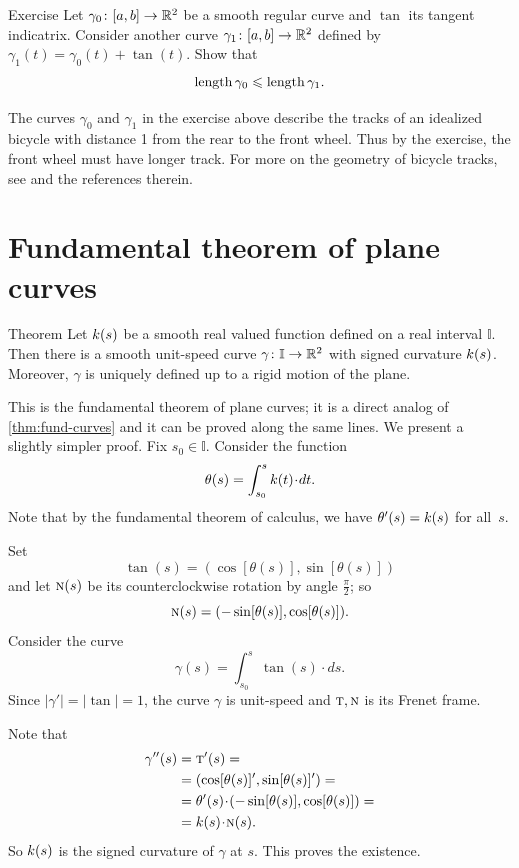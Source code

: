 \begin{thm}{Exercise}\label{ex:bike}
Let $\gamma_0\colon[a,b]\to\mathbb{R}^2$ be a smooth regular curve and $\tan$ its tangent indicatrix.
Consider another curve $\gamma_1\colon[a,b]\to\mathbb{R}^2$ defined by $\gamma_1(t)=\gamma_0(t)+\tan(t)$.
Show that
\[\mathop{\rm length}\nolimits\gamma_0\leqslant \mathop{\rm length}\nolimits\gamma_1.\]

\end{thm}

The curves $\gamma_0$ and $\gamma_1$ in the exercise above describe the tracks of an idealized bicycle with  distance 1 from the rear to the front wheel.
Thus by the exercise, the front wheel must have longer track.
For more on the geometry of bicycle tracks, see \cite{FLT} and the references therein.

\section*{Fundamental theorem of plane curves}

\begin{thm}{Theorem}\label{thm:fund-curves-2D}
Let $k(s)$ be a smooth real valued function defined on a real interval $\mathbb{I}$.
Then there is a smooth unit-speed curve $\gamma\colon\mathbb{I}\to\mathbb{R}^2$ with signed curvature $k(s)$.
Moreover, $\gamma$ is uniquely defined up to a rigid motion of the plane.
\end{thm}

This is the fundamental theorem of plane curves; it is a direct analog of \ref{thm:fund-curves} and it can be proved along the same lines.
We present a slightly simpler proof.
Fix $s_0\in\mathbb{I}$.
Consider the function
\[\theta(s)=\int_{s_0}^s\skur(t)\cdot dt.\]
Note that by the fundamental theorem of calculus, we have $\theta'(s)\z=\skur(s)$ for all~$s$.

Set 
\[\tan(s)=(\cos[\theta(s)],\sin[\theta(s)])\] and let $\textsc{n}(s)$ be its counterclockwise rotation by angle $\tfrac\pi2$; so 
\[\textsc{n}(s)=(-\sin[\theta(s)],\cos[\theta(s)]).\]
Consider the curve 
\[\gamma(s)=\int_{s_0}^s\tan(s)\cdot ds.\]
Since $|\gamma'|=|\tan|=1$, the curve $\gamma$ is unit-speed and $\textsc{t},\textsc{n}$ is its Frenet frame. 

Note that
\begin{align*}
\gamma''(s)&=\tan'(s)=
\\
&=(\cos[\theta(s)]',\sin[\theta(s)]')=
\\
&=\theta'(s)\cdot (-\sin[\theta(s)],\cos[\theta(s)])=
\\
&=\skur(s)\cdot \norm(s).
\end{align*}
So $k(s)$ is the signed curvature of $\gamma$ at $s$. This proves the existence.

